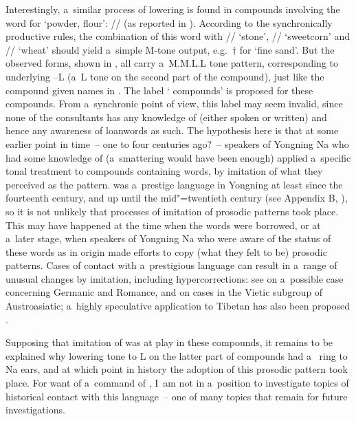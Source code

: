 Interestingly, a~similar process of lowering is found in compounds involving the word for ‘powder, flour’: // (as reported in ). According to the synchronically
productive rules, the combination of this word with // ‘stone’, //
‘sweetcorn’ and // ‘wheat’ should yield a~simple M-tone output,
e.g.~$\dagger$ for ‘fine sand’. But the observed forms, shown in , all carry a~M.M.L.L tone pattern, corresponding to underlying --L (a~L tone on the second part of the compound), just like the compound given names in . The label ‘ compounds’ is proposed for these compounds. From a~synchronic point of view, this label may seem invalid, since none of the consultants has any knowledge of  (either spoken or written) and hence any awareness of  loanwords as such. The hypothesis here is that at some earlier point in time~-- one to four centuries ago?~-- speakers of Yongning Na who had some knowledge of  (a~smattering would have been enough) applied a~specific tonal treatment to compounds containing  words, by imitation of what they perceived as the  pattern.  was a~prestige language in Yongning at least since the fourteenth century, and up until the mid"=twentieth century (see Appendix B, ), so it is not unlikely that processes of imitation of prosodic patterns took place. This may have happened at the time when the  words were borrowed, or at a~later stage, when speakers of Yongning Na who were aware of the status of these words as  in origin made efforts to copy (what they felt to be)  prosodic patterns. Cases of contact with a~prestigious language can result in a~range of unusual changes by imitation, including hypercorrections: see \citet[99-103]{meillet1936} on a~possible case concerning {Germanic} and {Romance}, and \citet{ferlus2001eng} on cases in the {Vietic} subgroup of Austroasiatic; a~highly speculative application to {Tibetan} has also been proposed \citep{ferlus2003a}. 

Supposing that imitation of  was at play in these compounds, it remains to be explained why lowering tone to L on the latter part of compounds had a~ ring to Na ears, and at which point in history the adoption of this prosodic pattern took place. For want of a~command of , I~am not in a~position to investigate topics of historical contact with this language~-- one of many topics that remain for future investigations.



